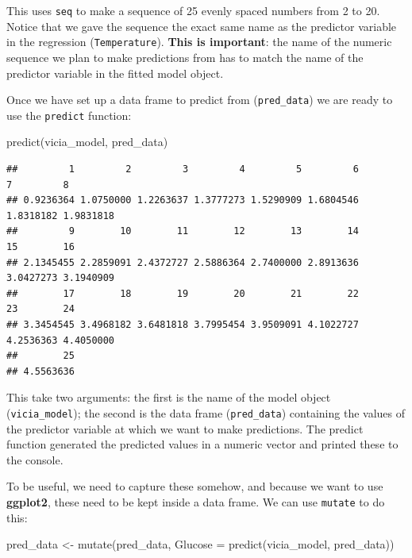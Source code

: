 \documentclass[
]{book}
\newenvironment{Shaded}{\begin{snugshade}}{\end{snugshade}}
\newcommand{\AttributeTok}[1]{\textcolor[rgb]{0.77,0.63,0.00}{#1}}
\newcommand{\FunctionTok}[1]{\textcolor[rgb]{0.00,0.00,0.00}{#1}}
\newcommand{\NormalTok}[1]{#1}
\newcommand{\OtherTok}[1]{\textcolor[rgb]{0.56,0.35,0.01}{#1}}
\begin{document}
This uses \texttt{seq} to make a sequence of 25 evenly spaced numbers from 2 to 20. Notice that we gave the sequence the exact same name as the predictor variable in the regression (\texttt{Temperature}). \textbf{This is important}: the name of the numeric sequence we plan to make predictions from has to match the name of the predictor variable in the fitted model object.

Once we have set up a data frame to predict from (\texttt{pred\_data}) we are ready to use the \texttt{predict} function:

\begin{Shaded}
\begin{Highlighting}[]
\FunctionTok{predict}\NormalTok{(vicia\_model, pred\_data)}
\end{Highlighting}
\end{Shaded}

\begin{verbatim}
##         1         2         3         4         5         6         7         8 
## 0.9236364 1.0750000 1.2263637 1.3777273 1.5290909 1.6804546 1.8318182 1.9831818 
##         9        10        11        12        13        14        15        16 
## 2.1345455 2.2859091 2.4372727 2.5886364 2.7400000 2.8913636 3.0427273 3.1940909 
##        17        18        19        20        21        22        23        24 
## 3.3454545 3.4968182 3.6481818 3.7995454 3.9509091 4.1022727 4.2536363 4.4050000 
##        25 
## 4.5563636
\end{verbatim}

This take two arguments: the first is the name of the model object (\texttt{vicia\_model}); the second is the data frame (\texttt{pred\_data}) containing the values of the predictor variable at which we want to make predictions. The predict function generated the predicted values in a numeric vector and printed these to the console.

To be useful, we need to capture these somehow, and because we want to use \textbf{ggplot2}, these need to be kept inside a data frame. We can use \texttt{mutate} to do this:

\begin{Shaded}
\begin{Highlighting}[]
\NormalTok{pred\_data }\OtherTok{\textless{}{-}} \FunctionTok{mutate}\NormalTok{(pred\_data, }\AttributeTok{Glucose =} \FunctionTok{predict}\NormalTok{(vicia\_model, pred\_data))}
\end{Highlighting}
\end{Shaded}
\end{document}

